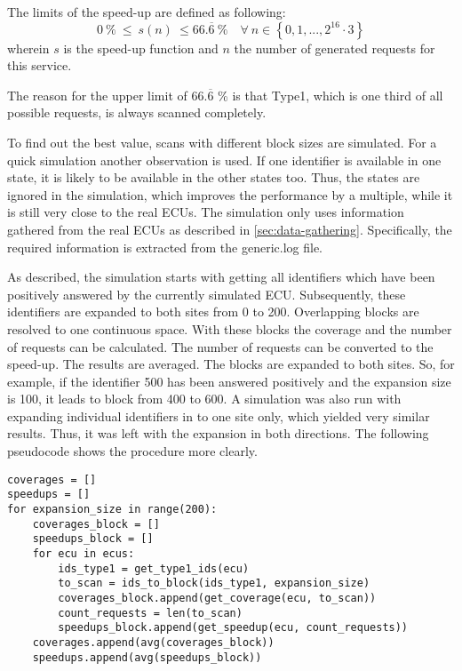 The limits of the speed-up are defined as following:
\[ 0\ \% \ \leq\  s(n)\  \leq 66.\overline{6}\ \% \quad \forall \  n \in \left\{0, 1, ..., 2^{16} \cdot 3\right\} \]
wherein $s$ is the speed-up function and $n$ the number of generated requests for this service.

The reason for the upper limit of $66.\overline{6}$ \% is that Type1, which is one third of all possible requests, is always scanned completely.

To find out the best value, scans with different block sizes are simulated. For a quick simulation another observation is used. If one identifier is available in one state, it is likely to be available in the other states too. Thus, the states are ignored in the simulation, which improves the performance by a multiple, while it is still very close to the real ECUs. The simulation only uses information gathered from the real ECUs as described in \autoref{sec:data-gathering}. Specifically, the required information is extracted from the generic.log file.

As described, the simulation starts with getting all identifiers which have been positively answered by the currently simulated ECU. Subsequently, these identifiers are expanded to both sites from 0 to 200. Overlapping blocks are resolved to one continuous space. With these blocks the coverage and the number of requests can be calculated. The number of requests can be converted to the speed-up. The results are averaged.
The blocks are expanded to both sites. So, for example, if the identifier 500 has been answered positively and the expansion size is 100, it leads to block from 400 to 600. A simulation was also run with expanding individual identifiers in to one site only, which yielded very similar results. Thus, it was left with the expansion in both directions. 
The following pseudocode shows the procedure more clearly.

\begin{samepage}
\begin{verbatim}
coverages = []
speedups = []
for expansion_size in range(200):
    coverages_block = []
    speedups_block = []
    for ecu in ecus:
        ids_type1 = get_type1_ids(ecu)
        to_scan = ids_to_block(ids_type1, expansion_size)
        coverages_block.append(get_coverage(ecu, to_scan))
        count_requests = len(to_scan)
        speedups_block.append(get_speedup(ecu, count_requests))
    coverages.append(avg(coverages_block))
    speedups.append(avg(speedups_block))
\end{verbatim}
\end{samepage}

